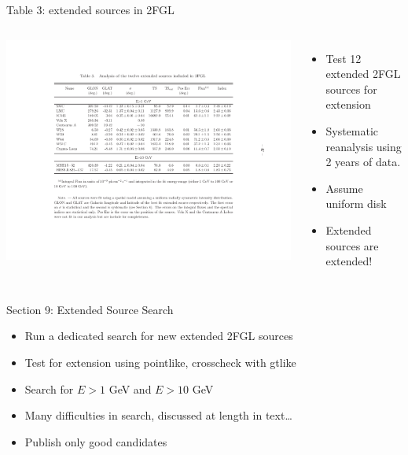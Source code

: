 \documentclass[12pt]{beamer}
\begin{document}
\begin{frame}{Table 3: extended sources in 2FGL}
  \begin{columns}
    \includegraphics[scale=0.4]{plots/table_reanalysis.pdf}
    \begin{itemize}
      \item Test 12 extended 2FGL sources for extension
      \item Systematic reanalysis using 2 years of data.
      \item Assume uniform disk
      \item Extended sources are extended!
    \end{itemize}
  \end{columns}
\end{frame}

\begin{frame}{Section 9: Extended Source Search}
  \begin{itemize}
    \item Run a dedicated search for new
    extended 2FGL sources
    \item Test for extension using pointlike, crosscheck with gtlike
    \item Search for $E>1$ GeV and $E>10$ GeV
    \item Many difficulties in search, discussed at length in text\dots
    \item Publish only good candidates
  \end{itemize}
\end{frame}
\end{document}
